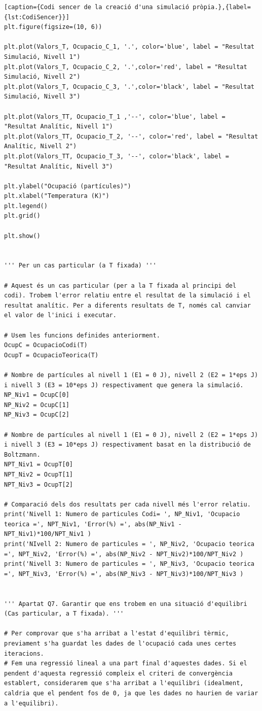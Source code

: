 \documentclass[a4paper,10.5pt]{report}
\begin{document}
\begin{appendices}
\begin{lstlisting}[caption={Codi sencer de la creació d'una simulació pròpia.},{label={lst:CodiSencer}}]
plt.figure(figsize=(10, 6))

plt.plot(Valors_T, Ocupacio_C_1, '.', color='blue', label = "Resultat Simulació, Nivell 1")
plt.plot(Valors_T, Ocupacio_C_2, '.',color='red', label = "Resultat Simulació, Nivell 2")
plt.plot(Valors_T, Ocupacio_C_3, '.',color='black', label = "Resultat Simulació, Nivell 3")

plt.plot(Valors_TT, Ocupacio_T_1 ,'--', color='blue', label = "Resultat Analític, Nivell 1")
plt.plot(Valors_TT, Ocupacio_T_2, '--', color='red', label = "Resultat Analític, Nivell 2")
plt.plot(Valors_TT, Ocupacio_T_3, '--', color='black', label = "Resultat Analític, Nivell 3")

plt.ylabel("Ocupació (partícules)")
plt.xlabel("Temperatura (K)")
plt.legend()
plt.grid()

plt.show()


''' Per un cas particular (a T fixada) '''

# Aquest és un cas particular (per a la T fixada al principi del codi). Trobem l'error relatiu entre el resultat de la simulació i el resultat analític. Per a diferents resultats de T, només cal canviar el valor de l'inici i executar.

# Usem les funcions definides anteriorment. 
OcupC = OcupacioCodi(T)
OcupT = OcupacioTeorica(T)

# Nombre de partícules al nivell 1 (E1 = 0 J), nivell 2 (E2 = 1*eps J) i nivell 3 (E3 = 10*eps J) respectivament que genera la simulació.
NP_Niv1 = OcupC[0]
NP_Niv2 = OcupC[1]
NP_Niv3 = OcupC[2]

# Nombre de partícules al nivell 1 (E1 = 0 J), nivell 2 (E2 = 1*eps J) i nivell 3 (E3 = 10*eps J) respectivament basat en la distribució de Boltzmann.
NPT_Niv1 = OcupT[0]
NPT_Niv2 = OcupT[1]
NPT_Niv3 = OcupT[2]

# Comparació dels dos resultats per cada nivell més l'error relatiu. 
print('Nivell 1: Numero de particules Codi= ', NP_Niv1, 'Ocupacio teorica =', NPT_Niv1, 'Error(%) =', abs(NP_Niv1 - NPT_Niv1)*100/NPT_Niv1 )
print('NIvell 2: Numero de particules = ', NP_Niv2, 'Ocupacio teorica =', NPT_Niv2, 'Error(%) =', abs(NP_Niv2 - NPT_Niv2)*100/NPT_Niv2 )
print('Nivell 3: Numero de particules = ', NP_Niv3, 'Ocupacio teorica =', NPT_Niv3, 'Error(%) =', abs(NP_Niv3 - NPT_Niv3)*100/NPT_Niv3 )


''' Apartat Q7. Garantir que ens trobem en una situació d'equilibri (Cas particular, a T fixada). '''

# Per comprovar que s'ha arribat a l'estat d'equilibri tèrmic, previament s'ha guardat les dades de l'ocupació cada unes certes iteracions. 
# Fem una regressió lineal a una part final d'aquestes dades. Si el pendent d'aquesta regressió compleix el criteri de convergència establert, considerarem que s'ha arribat a l'equilibri (idealment, caldria que el pendent fos de 0, ja que les dades no haurien de variar a l'equilibri). 


\end{lstlisting}
\end{appendices}
\end{document}
